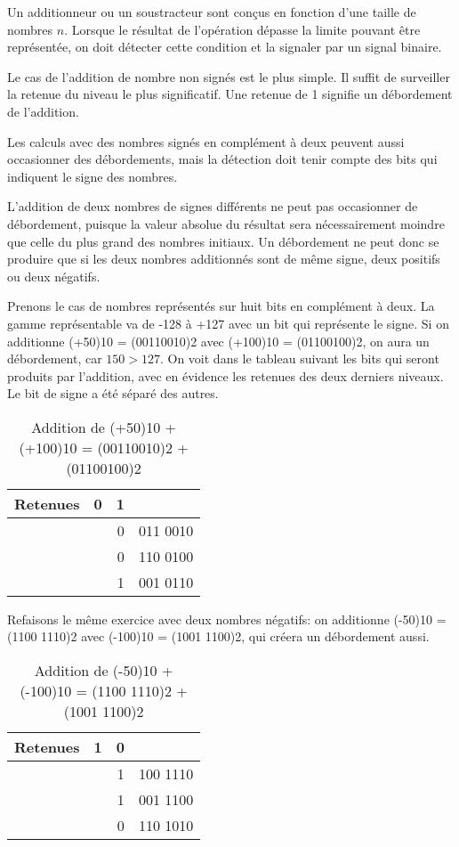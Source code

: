 \documentclass[11pt]{article}
\begin{document}
Un additionneur ou un soustracteur sont conçus en fonction d'une
taille de nombres \(n\). Lorsque le résultat de l'opération dépasse la
limite pouvant être représentée, on doit détecter cette condition et
la signaler par un signal binaire.

Le cas de l'addition de nombre non signés est le plus simple. Il
suffit de surveiller la retenue du niveau le plus significatif. Une
retenue de 1 signifie un débordement de l'addition.

Les calculs avec des nombres signés en complément à deux peuvent aussi
occasionner des débordements, mais la détection doit tenir compte des
bits qui indiquent le signe des nombres.

L'addition de deux nombres de signes différents ne peut pas
occasionner de débordement, puisque la valeur absolue du résultat sera
nécessairement moindre que celle du plus grand des nombres
initiaux. Un débordement ne peut donc se produire que si les deux
nombres additionnés sont de même signe, deux positifs ou deux
négatifs.

Prenons le cas de nombres représentés sur huit bits en complément à
deux. La gamme représentable va de -128 à +127 avec un bit qui
représente le signe. Si on additionne (+50)10 = (00110010)2 avec
(+100)10 = (01100100)2, on aura un débordement, car \(150 > 127\). On
voit dans le tableau suivant les bits qui seront produits par
l'addition, avec en évidence les retenues des deux derniers
niveaux. Le bit de signe a été séparé des autres.

\begin{table}[htbp]
\caption{\label{tab:orgaf7eaf7}Addition de (+50)10 + (+100)10 = (00110010)2 + (01100100)2}
\centering
\begin{tabular}{lrrl}
Retenues & 0 & 1 & \\
\hline
 &  & 0 & 011 0010\\
 &  & 0 & 110 0100\\
\hline
 &  & 1 & 001 0110\\
\end{tabular}
\end{table}

Refaisons le même exercice avec deux nombres négatifs: on additionne
(-50)10 = (1100 1110)2 avec (-100)10 = (1001 1100)2, qui créera un
débordement aussi.

\begin{table}[htbp]
\caption{\label{tab:org0591584}Addition de (-50)10 + (-100)10 = (1100 1110)2 + (1001 1100)2}
\centering
\begin{tabular}{lrrl}
Retenues & 1 & 0 & \\
\hline
 &  & 1 & 100 1110\\
 &  & 1 & 001 1100\\
\hline
 &  & 0 & 110 1010\\
\end{tabular}
\end{table}
\end{document}
